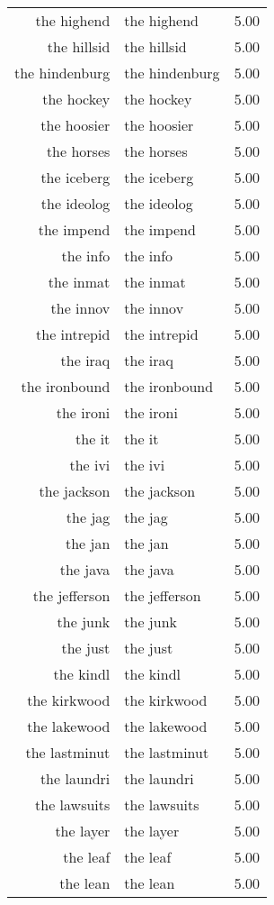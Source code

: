 \begin{table}[ht]
\begin{tabular}{rlr}
  the highend & the highend & 5.00 \\ 
  the hillsid & the hillsid & 5.00 \\ 
  the hindenburg & the hindenburg & 5.00 \\ 
  the hockey & the hockey & 5.00 \\ 
  the hoosier & the hoosier & 5.00 \\ 
  the horses & the horses & 5.00 \\ 
  the iceberg & the iceberg & 5.00 \\ 
  the ideolog & the ideolog & 5.00 \\ 
  the impend & the impend & 5.00 \\ 
  the info & the info & 5.00 \\ 
  the inmat & the inmat & 5.00 \\ 
  the innov & the innov & 5.00 \\ 
  the intrepid & the intrepid & 5.00 \\ 
  the iraq & the iraq & 5.00 \\ 
  the ironbound & the ironbound & 5.00 \\ 
  the ironi & the ironi & 5.00 \\ 
  the it & the it & 5.00 \\ 
  the ivi & the ivi & 5.00 \\ 
  the jackson & the jackson & 5.00 \\ 
  the jag & the jag & 5.00 \\ 
  the jan & the jan & 5.00 \\ 
  the java & the java & 5.00 \\ 
  the jefferson & the jefferson & 5.00 \\ 
  the junk & the junk & 5.00 \\ 
  the just & the just & 5.00 \\ 
  the kindl & the kindl & 5.00 \\ 
  the kirkwood & the kirkwood & 5.00 \\ 
  the lakewood & the lakewood & 5.00 \\ 
  the lastminut & the lastminut & 5.00 \\ 
  the laundri & the laundri & 5.00 \\ 
  the lawsuits & the lawsuits & 5.00 \\ 
  the layer & the layer & 5.00 \\ 
  the leaf & the leaf & 5.00 \\ 
  the lean & the lean & 5.00 \\ 

\end{tabular}
\end{table}
